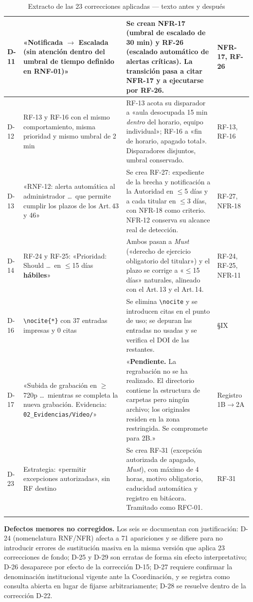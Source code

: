 \documentclass[11pt,letterpaper]{article}
\begin{document}
\begin{longtable}{|p{0.85cm}|p{5.4cm}|p{5.4cm}|p{2.4cm}|}
D-11 & «Notificada $\rightarrow$ Escalada (sin atención dentro del umbral de tiempo definido en RNF-01)» & Se crean NFR-17 (umbral de escalado de 30 min) y RF-26 (escalado automático de alertas críticas). La transición pasa a citar NFR-17 y a ejecutarse por RF-26. & NFR-17, RF-26 \\ \hline
D-12 & RF-13 y RF-16 con el mismo comportamiento, misma prioridad y mismo umbral de 2 min & RF-13 acota su disparador a «aula desocupada 15 min \emph{dentro} del horario, equipo individual»; RF-16 a «fin de horario, apagado total». Disparadores disjuntos, umbral conservado. & RF-13, RF-16 \\ \hline
D-13 & «RNF-12: alerta automática al administrador \dots\ que permite cumplir los plazos de los Art.\,43 y 46» & Se crea RF-27: expediente de la brecha y notificación a la Autoridad en $\leq$5 días y a cada titular en $\leq$3 días, con NFR-18 como criterio. NFR-12 conserva su alcance real de detección. & RF-27, NFR-18 \\ \hline
D-14 & RF-24 y RF-25: «Prioridad: Should \dots\ en $\leq$15 días \textbf{hábiles}» & Ambos pasan a \emph{Must} («derecho de ejercicio obligatorio del titular») y el plazo se corrige a «$\leq$15 días» naturales, alineado con el Art.\,13 y el Art.\,14. & RF-24, RF-25, NFR-11 \\ \hline
D-16 & \texttt{\textbackslash nocite\{*\}} con 37 entradas impresas y 0 citas & Se elimina \texttt{\textbackslash nocite} y se introducen citas en el punto de uso; se depuran las entradas no usadas y se verifica el DOI de las restantes. & \S IX \\ \hline
D-17 & «Subida de grabación en $\geq$720p \dots\ mientras se completa la nueva grabación. Evidencia: \texttt{02\_Evidencias/Video/}» & «\textbf{Pendiente.} La regrabación no se ha realizado. El directorio contiene la estructura de carpetas pero ningún archivo; los originales residen en la zona restringida. Se compromete para 2B.» & Registro 1B$\rightarrow$2A \\ \hline
D-23 & Estrategia: «permitir excepciones autorizadas», sin RF destino & Se crea RF-31 (excepción autorizada de apagado, \emph{Must}), con máximo de 4 horas, motivo obligatorio, caducidad automática y registro en bitácora. Tramitado como RFC-01. & RF-31 \\ \hline
\caption{Extracto de las 23 correcciones aplicadas --- texto antes y después}
\end{longtable}
\normalsize

\textbf{Defectos menores no corregidos.} Los seis se documentan con justificación: D-24 (nomenclatura RNF/NFR) afecta a 71 apariciones y se difiere para no introducir errores de sustitución masiva en la misma versión que aplica 23 correcciones de fondo; D-25 y D-29 son erratas de forma sin efecto interpretativo; D-26 desaparece por efecto de la corrección D-15; D-27 requiere confirmar la denominación institucional vigente ante la Coordinación, y se registra como consulta abierta en lugar de fijarse arbitrariamente; D-28 se resuelve dentro de la corrección D-22.
\end{document}
